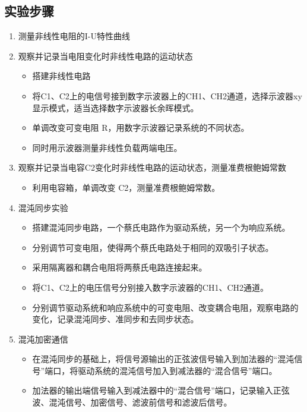 \documentclass[a4paper, 1.5lines]{ctexart}
\begin{document}
        \subsection{实验步骤}
            \begin{enumerate}
            \item 测量非线性电阻的I-U特性曲线\\

            \item 观察并记录当电阻变化时非线性电路的运动状态
                \begin{itemize}
                    \item 搭建非线性电路
                    \item 将C1、C2上的电信号接到数字示波器上的CH1、CH2通道，选择示波器xy显示模式，适当选择数字示波器长余晖模式。
                    \item 单调改变可变电阻 R，用数字示波器记录系统的不同状态。
                    \item 同时用示波器测量非线性负载两端电压。            
                \end{itemize}
        
            \item 观察并记录当电容C2变化时非线性电路的运动状态，测量准费根鲍姆常数
                \begin{itemize}
                    \item 利用电容箱，单调改变 C2，测量准费根鲍姆常数。
                \end{itemize}
        
                \item 混沌同步实验
                \begin{itemize}
                    \item 搭建混沌同步电路，一个蔡氏电路作为驱动系统，另一个为响应系统。
                    \item 分别调节可变电阻，使得两个蔡氏电路处于相同的双吸引子状态。
                    \item 采用隔离器和耦合电阻将两蔡氏电路连接起来。
                    \item 将C1、C2上的电压信号分别接入数字示波器的CH1、CH2通道。
                    \item 分别调节驱动系统和响应系统中的可变电阻、改变耦合电阻，观察电路的变化，记录混沌同步、准同步和去同步状态。
                \end{itemize}
        
                \item 混沌加密通信
                \begin{itemize}
                    \item 在混沌同步的基础上，将信号源输出的正弦波信号输入到加法器的“混沌信号”端口，将驱动系统的混沌信号加入到减法器的“混合信号”端口。
                    \item 加法器的输出端信号输入到减法器中的“混合信号”端口，记录输入正弦波、混沌信号、加密信号、滤波前信号和滤波后信号。
                \end{itemize}
            \end{enumerate}
            
\end{document}
